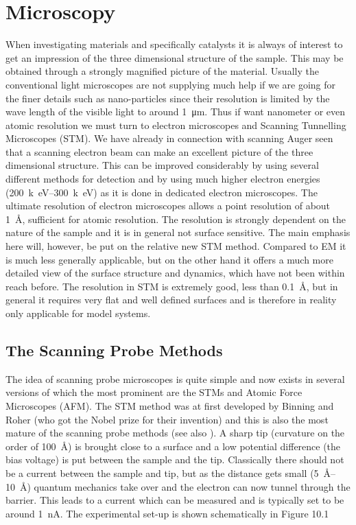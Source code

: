 \newpage
\chapter{Microscopy}
When investigating materials and specifically catalysts it is always of interest to get an impression of the three dimensional structure of the sample. This may be obtained through a strongly magnified picture of the material. Usually the conventional light microscopes are not supplying much help if we are going for the finer details such as nano-particles since their resolution is limited by the wave length of the visible light to around \SI{1}{\micro m}. Thus if want nanometer or even atomic resolution we must turn to electron microscopes and Scanning Tunnelling Microscopes (STM). We have already in connection with scanning Auger seen that a scanning electron beam can make an excellent picture of the three dimensional structure. This can be improved considerably by using several different methods for detection and by using much higher electron energies (\SIrange{200}{300}{k\electronvolt}) as it is done in dedicated electron microscopes. The ultimate resolution of electron microscopes allows a point resolution of about \SI{1}{\angstrom}, sufficient for atomic resolution. The resolution is  strongly dependent on  the nature of the sample and it is in general not surface sensitive. The main emphasis here will, however, be put on the relative new STM method. Compared to EM it is much less generally applicable, but on the other hand it offers a much more detailed view of the surface structure and dynamics, which have not been within reach before. The resolution in STM is  extremely good, less than \SI{.1}{\angstrom}, but in general it requires very flat and well defined surfaces and is therefore in reality only applicable for model systems.

\section{The Scanning Probe Methods}
The idea of scanning probe microscopes is quite simple and now exists in several versions of which the most prominent are  the STMs and Atomic Force Microscopes (AFM). The STM method was at first developed by Binning and Roher \cite{Roher1, Roher2, Roher3} (who got the Nobel prize for their invention) and this is also the most mature of the scanning probe methods (see also \cite{STM}). A sharp tip (curvature on the order of \SI{100}{\angstrom}) is brought close to a surface and a low potential difference (the bias voltage) is put between the sample and the tip. Classically there should not be a current between the sample and tip, but as the distance gets small (\SIrange{5}{10}{\angstrom}) quantum mechanics take over and the electron can now tunnel through the barrier. This leads to a current which can be measured and is typically set to be around \SI{1}{nA}. The experimental set-up is shown schematically in Figure 10.1

